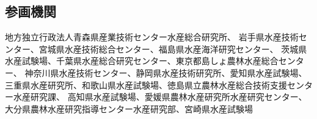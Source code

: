 \subsection{参画機関}
地方独立行政法人青森県産業技術センター水産総合研究所、
岩手県水産技術センター、宮城県水産技術総合センター、福島県水産海洋研究センター、
茨城県水産試験場、千葉県水産総合研究センター、東京都島しょ農林水産総合センター、
神奈川県水産技術センター、静岡県水産技術研究所、愛知県水産試験場、
三重県水産研究所、和歌山県水産試験場、徳島県立農林水産総合技術支援センター水産研究課、
高知県水産試験場、愛媛県農林水産研究所水産研究センター、
大分県農林水産研究指導センター水産研究部、宮崎県水産試験場
